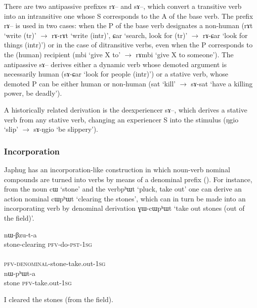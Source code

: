 \documentclass[oldfontcommands,oneside,a4paper,11pt]{article}
\newcommand{\ipa}[1]{{\phon #1}} %
\begin{document}
There are two antipassive prefixes \ipa{rɤ--} and \ipa{sɤ--}, which convert a transitive verb into an intransitive one whose S corresponds to the A of the base verb. The prefix \ipa{rɤ--} is used in two cases: when the P of the base verb designates a non-human (\ipa{rɤt} `write (tr)' $\rightarrow$ \ipa{rɤ-rɤt} `write (intr)', \ipa{ɕar} `search, look for (tr)' $\rightarrow$ \ipa{rɤ-ɕar} `look for things (intr)') or in the case of ditransitive verbs, even when the P corresponds to the (human) recipient (\ipa{mbi} `give X to' $\rightarrow$ \ipa{rɤmbi} `give X to someone'). The antipassive \ipa{sɤ--} derives either a dynamic verb whose demoted argument is necessarily human (\ipa{sɤ-ɕar} `look for people (intr)') or a stative verb, whose demoted P can be either human or non-human (\ipa{sat} `kill' $\rightarrow$ \ipa{sɤ-sat} `have a killing power, be deadly'). 

A historically related derivation is the deexperiencer \ipa{sɤ--}, which derives a stative verb from any stative verb, changing an experiencer S into the stimulus (\ipa{ŋgio} `slip' $\rightarrow$ \ipa{sɤ-ŋgio} `be slippery').

\subsubsection{Incorporation}
Japhug has an incorporation-like construction in which noun-verb nominal compounds are turned into verbs by means of a denominal prefix (\citealt{jacques12incorp}). For instance, from the noun \ipa{cɯ} `stone' and the verb\ipa{pʰɯt} `pluck, take out' one can derive an action nominal    \ipa{cɯpʰɯt} `clearing the stones', which can in turn be made into an incorporating verb by denominal derivation  \ipa{ɣɯ-cɯpʰɯt } `take out stones (out of the field)'.

\begin{exe}   
\ex
\begin{xlist}[(ii)]
\gll     \ipa{cɯ-pʰɯt} \ipa{nɯ-βzu-t-a}  \\
  stone-clearing \textsc{pfv}-do-\textsc{pst}-\textsc{1sg} \\
\gll     \ipa{nɯ-ɣɯ-cɯ-pʰɯt-a}  \\
  \textsc{pfv-denominal}-stone-take.out-\textsc{1sg} \\
\gll     \ipa{cɯ} \ipa{nɯ-pʰɯt-a}  \\
  stone \textsc{pfv}-take.out-\textsc{1sg} \\
  \end{xlist}
 \glt   I cleared the stones (from the field). 
\end{exe}   
\end{document}
